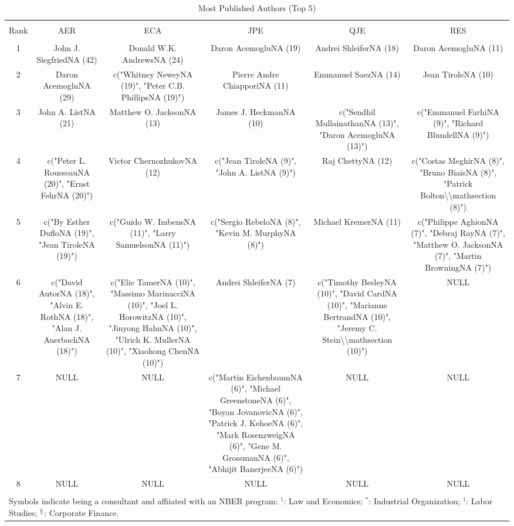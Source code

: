 
\begin{table}[!htbp] \centering 
  \caption{Most Published Authors (Top 5)} 
  \label{} 
\footnotesize 
\begin{tabular}{@{\extracolsep{5pt}} cccccc} 
\\[-1.8ex]\hline 
\hline \\[-1.8ex] 
Rank & AER & ECA & JPE & QJE & RES \\ 
\hline \\[-1.8ex] 
1 & John J. SiegfriedNA (42) & Donald W.K. AndrewsNA (24) & Daron AcemogluNA (19) & Andrei ShleiferNA (18) & Daron AcemogluNA (11) \\ 
2 & Daron AcemogluNA (29) & c("Whitney NeweyNA (19)", "Peter C.B. PhillipsNA (19)") & Pierre Andre ChiapporiNA (11) & Emmanuel SaezNA (14) & Jean TiroleNA (10) \\ 
3 & John A. ListNA (21) & Matthew O. JacksonNA (13) & James J. HeckmanNA (10) & c("Sendhil MullainathanNA (13)", "Daron AcemogluNA (13)") & c("Emmanuel FarhiNA (9)", "Richard BlundellNA (9)") \\ 
4 & c("Peter L. RousseauNA (20)", "Ernst FehrNA (20)") & Victor ChernozhukovNA (12) & c("Jean TiroleNA (9)", "John A. ListNA (9)") & Raj ChettyNA (12) & c("Costas MeghirNA (8)", "Bruno BiaisNA (8)", "Patrick Bolton\textbackslash \textbackslash mathsection (8)") \\ 
5 & c("By Esther DufloNA (19)", "Jean TiroleNA (19)") & c("Guido W. ImbensNA (11)", "Larry SamuelsonNA (11)") & c("Sergio RebeloNA (8)", "Kevin M. MurphyNA (8)") & Michael KremerNA (11) & c("Philippe AghionNA (7)", "Debraj RayNA (7)", "Matthew O. JacksonNA (7)", "Martin BrowningNA (7)") \\ 
6 & c("David AutorNA (18)", "Alvin E. RothNA (18)", "Alan J. AuerbachNA (18)") & c("Elie TamerNA (10)", "Massimo MarinacciNA (10)", "Joel L. HorowitzNA (10)", "Jinyong HahnNA (10)", "Ulrich K. MullerNA (10)", "Xiaohong ChenNA (10)") & Andrei ShleiferNA (7) & c("Timothy BesleyNA (10)", "David CardNA (10)", "Marianne BertrandNA (10)", "Jeremy C. Stein\textbackslash \textbackslash mathsection (10)") & NULL \\ 
7 & NULL & NULL & c("Martin EichenbaumNA (6)", "Michael GreenstoneNA (6)", "Boyan JovanovicNA (6)", "Patrick J. KehoeNA (6)", "Mark RosenzweigNA (6)", "Gene M. GrossmanNA (6)", "Abhijit BanerjeeNA (6)") & NULL & NULL \\ 
8 & NULL & NULL & NULL & NULL & NULL \\ 
\hline \\[-1.8ex] 
\multicolumn{6}{l}{Symbols indicate being a consultant and affiiated with an NBER program: $^{\dag}$: Law and Economics; $^{*}$: Industrial Organization; $^{\dag}$: Labor Studies; $^{\mathsection}$: Corporate Finance.} \\ 
\end{tabular} 
\end{table} 
